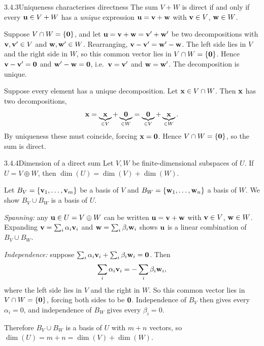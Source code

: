 \begin{thms}{3.4.3}{Uniqueness characterises directness}
The sum $V+W$ is direct if and only if every $\mathbf{u}\in V+W$ has a \emph{unique} expression $\mathbf{u}=\mathbf{v}+\mathbf{w}$ with $\mathbf{v}\in V$, $\mathbf{w}\in W$.
\end{thms}

\begin{prf}
\case{($\Rightarrow$)} Suppose $V\cap W=\{\mathbf{0}\}$, and let $\mathbf{u}=\mathbf{v}+\mathbf{w}=\mathbf{v}'+\mathbf{w}'$ be two decompositions with $\mathbf{v},\mathbf{v}'\in V$ and $\mathbf{w},\mathbf{w}'\in W$. Rearranging, $\mathbf{v}-\mathbf{v}'=\mathbf{w}'-\mathbf{w}$. The left side lies in $V$ and the right side in $W$, so this common vector lies in $V\cap W=\{\mathbf{0}\}$. Hence $\mathbf{v}-\mathbf{v}'=\mathbf{0}$ and $\mathbf{w}'-\mathbf{w}=\mathbf{0}$, i.e.\ $\mathbf{v}=\mathbf{v}'$ and $\mathbf{w}=\mathbf{w}'$. The decomposition is unique.

\case{($\Leftarrow$)} Suppose every element has a unique decomposition. Let $\mathbf{x}\in V\cap W$. Then $\mathbf{x}$ has two decompositions,
\[
\mathbf{x}=\underbrace{\mathbf{x}}_{\in V}+\underbrace{\mathbf{0}}_{\in W}=\underbrace{\mathbf{0}}_{\in V}+\underbrace{\mathbf{x}}_{\in W}.
\]
By uniqueness these must coincide, forcing $\mathbf{x}=\mathbf{0}$. Hence $V\cap W=\{\mathbf{0}\}$, so the sum is direct.
\end{prf}

\begin{thms}{3.4.4}{Dimension of a direct sum}
Let $V,W$ be finite-dimensional subspaces of $U$. If $U=V\oplus W$, then $\dim(U)=\dim(V)+\dim(W)$.
\end{thms}

\begin{prf}
Let $B_V=\{\mathbf{v}_1,\dots,\mathbf{v}_m\}$ be a basis of $V$ and $B_W=\{\mathbf{w}_1,\dots,\mathbf{w}_n\}$ a basis of $W$. We show $B_V\cup B_W$ is a basis of $U$.

\emph{Spanning:} any $\mathbf{u}\in U=V\oplus W$ can be written $\mathbf{u}=\mathbf{v}+\mathbf{w}$ with $\mathbf{v}\in V$, $\mathbf{w}\in W$. Expanding $\mathbf{v}=\sum_i\alpha_i\mathbf{v}_i$ and $\mathbf{w}=\sum_i\beta_i\mathbf{w}_i$ shows $\mathbf{u}$ is a linear combination of $B_V\cup B_W$.

\emph{Independence:} suppose $\sum_i\alpha_i\mathbf{v}_i+\sum_i\beta_i\mathbf{w}_i=\mathbf{0}$. Then
\[
\sum_i\alpha_i\mathbf{v}_i=-\sum_i\beta_i\mathbf{w}_i,
\]
where the left side lies in $V$ and the right in $W$. So this common vector lies in $V\cap W=\{\mathbf{0}\}$, forcing both sides to be $\mathbf{0}$. Independence of $B_V$ then gives every $\alpha_i=0$, and independence of $B_W$ gives every $\beta_i=0$.

Therefore $B_V\cup B_W$ is a basis of $U$ with $m+n$ vectors, so $\dim(U)=m+n=\dim(V)+\dim(W)$.
\end{prf}

